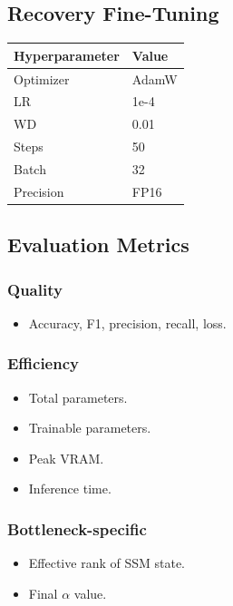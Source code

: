 \subsection{Recovery Fine-Tuning}

\begin{table}[H]
\centering
\small
\begin{tabular}{ll}
\toprule
\textbf{Hyperparameter} & \textbf{Value} \\
\midrule
Optimizer & AdamW \\
LR & 1e-4 \\
WD & 0.01 \\
Steps & 50 \\
Batch & 32 \\
Precision & FP16 \\
\bottomrule
\end{tabular}
\end{table}

\subsection{Evaluation Metrics}

\subsubsection{Quality}
\begin{itemize}
\item Accuracy, F1, precision, recall, loss.

\end{itemize}
\subsubsection{Efficiency}
\begin{itemize}
\item Total parameters.
\item Trainable parameters.
\item Peak VRAM.
\item Inference time.

\end{itemize}
\subsubsection{Bottleneck-specific}
\begin{itemize}
\item Effective rank of SSM state.
\item Final $\alpha$ value.

\end{itemize}
